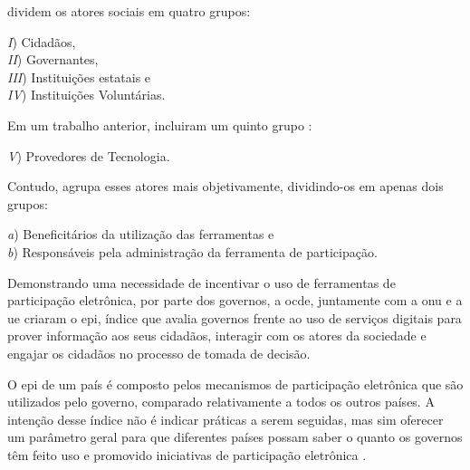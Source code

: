 \par
{} dividem os atores sociais em quatro grupos: 

\begin{minipage}{.66\textwidth}	
   \textit{I}) Cidadãos, \\
   \textit{II}) Governantes, \\
   \textit{III}) Instituições estatais e \\
   \textit{IV}) Instituições Voluntárias. \\
\end{minipage}

\par
Em um trabalho anterior,  incluiram um quinto grupo :

\begin{minipage}{.66\textwidth}	
    \textit{V}) Provedores de Tecnologia.
\end{minipage}	

\par
Contudo,  agrupa esses atores mais objetivamente, dividindo-os em apenas dois grupos:\\

\begin{minipage}{.66\textwidth}	
   \textit{a}) Beneficitários da utilização das ferramentas e \\
   \textit{b}) Responsáveis pela administração da ferramenta de participação.  \\
\end{minipage}

\par
Demonstrando uma necessidade de incentivar o uso de ferramentas de participação eletrônica, por parte dos governos,  a \acrfull{ocde}, juntamente com a \acrshort{onu} 
e a \acrfull{ue} criaram o \acrfull{epi}, índice que avalia governos frente ao uso de serviços digitais para prover informação aos seus cidadãos, interagir com os atores da 
sociedade e engajar os cidadãos no processo de tomada de decisão. 

\par 
O \acrshort{epi} de um país é composto pelos mecanismos de participação eletrônica que são utilizados pelo governo, comparado relativamente a todos os outros países.
A intenção desse índice não é indicar práticas a serem seguidas, mas sim oferecer um parâmetro geral para que diferentes países possam saber o quanto os governos têm 
feito uso e promovido iniciativas de participação eletrônica \cite{onu2018} .


